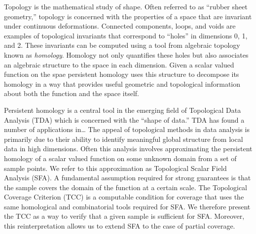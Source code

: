 
Topology is the mathematical study of shape.
Often referred to as ``rubber sheet geometry,'' topology is concerned with the properties of a space that are invariant under continuous deformations.
Connected components, loops, and voids are examples of topological invariants that correspond to ``holes'' in dimensions 0, 1, and 2.
These invariants can be computed using a tool from algebraic topology known as \emph{homology}.
Homology not only quantifies these holes but also associates an algebraic structure to the space in each dimension.
Given a scalar valued function on the spae persistent homology uses this structure to decompose its homology in a way that provides useful geometric and topological information about both the function and the space itself.

Persistent homology is a central tool in the emerging field of Topological Data Analysis (TDA) which is concerned with the ``shape of data.''
TDA has found a number of applications in\ldots
The appeal of topological methods in data analysis is primarily due to their ability to identify meaningful global structure from local data in high dimensions.
Often this analysis involves approximating the persistent homology of a scalar valued function on some unknown domain from a set of sample points.
We refer to this approximation as Topological Scalar Field Analysis (SFA).
A fundamental assumption required for strong guarantees is that the sample covers the domain of the function at a certain scale.
The Topological Coverage Criterion (TCC) is a computable condition for coverage that uses the same homological and combinatorial tools required for SFA.
We therefore present the TCC as a way to verify that a given sample is sufficient for SFA.
Moreover, this reinterpretation allows us to extend SFA to the case of partial coverage.


